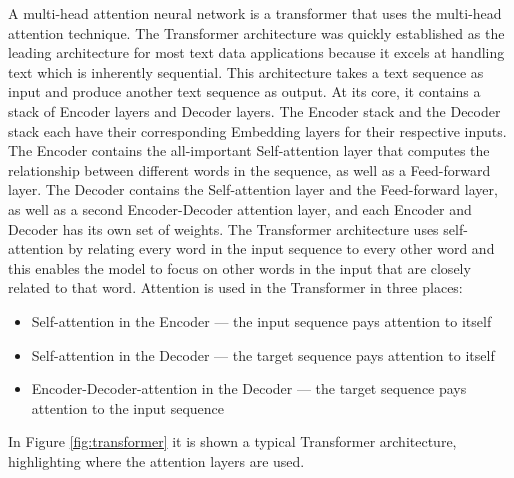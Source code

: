 \documentclass[../main.tex]{subfiles}
\begin{document}
A multi-head attention neural network is a transformer that uses the multi-head attention technique. The Transformer architecture was quickly established as the leading architecture for most text data applications because it excels at handling text which is inherently sequential. This architecture takes a text sequence as input and produce another text sequence as output. At its core, it contains a stack of Encoder layers and Decoder layers. The Encoder stack and the Decoder stack each have their corresponding Embedding layers for their respective inputs. The Encoder contains the all-important Self-attention layer that computes the relationship between different words in the sequence, as well as a Feed-forward layer. The Decoder contains the Self-attention layer and the Feed-forward layer, as well as a second Encoder-Decoder attention layer, and each Encoder and Decoder has its own set of weights. The Transformer architecture uses self-attention by relating every word in the input sequence to every other word and this enables the model to focus on other words in the input that are closely related to that word. Attention is used in the Transformer in three places: 

\begin{itemize}
    \item Self-attention in the Encoder — the input sequence pays attention to itself
    \item Self-attention in the Decoder — the target sequence pays attention to itself
    \item Encoder-Decoder-attention in the Decoder — the target sequence pays attention to the input sequence
\end{itemize}

In Figure \ref{fig:transformer} it is shown a typical Transformer architecture, highlighting where the attention layers are used.
\end{document}
